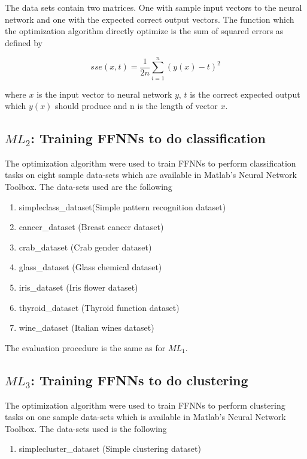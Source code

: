 The data sets contain two matrices. One with sample input vectors to the neural network and one with the expected correct output vectors. The function which the optimization algorithm directly optimize is the sum of squared errors as defined by

\begin{equation}
  sse(x,t) = \frac{1}{2n} \sum_{i=1}^{n}{(y(x)-t)^2}
\end{equation}

where $x$ is the input vector to neural network $y$, $t$ is the correct expected output which $y(x)$ should produce and n is the length of vector $x$.

\subsection{$ML_{2}$: Training FFNNs to do classification}

The optimization algorithm were used to train FFNNs to perform classification tasks on eight sample data-sets which are available in Matlab's Neural Network Toolbox. The data-sets used are the following

\begin{enumerate}
  \item simpleclass\_dataset(Simple pattern recognition dataset)
  \item cancer\_dataset (Breast cancer dataset)
  \item crab\_dataset (Crab gender dataset)
  \item glass\_dataset (Glass chemical dataset)
  \item iris\_dataset (Iris flower dataset)
  \item thyroid\_dataset (Thyroid function dataset)
  \item wine\_dataset (Italian wines dataset)
\end{enumerate}

The evaluation procedure is the same as for $ML_{1}$.

\subsection{$ML_{3}$: Training FFNNs to do clustering}

The optimization algorithm were used to train FFNNs to perform clustering tasks on one sample data-sets which is available in Matlab's Neural Network Toolbox. The data-sets used is the following

\begin{enumerate}
  \item simplecluster\_dataset (Simple clustering dataset)
\end{enumerate}

